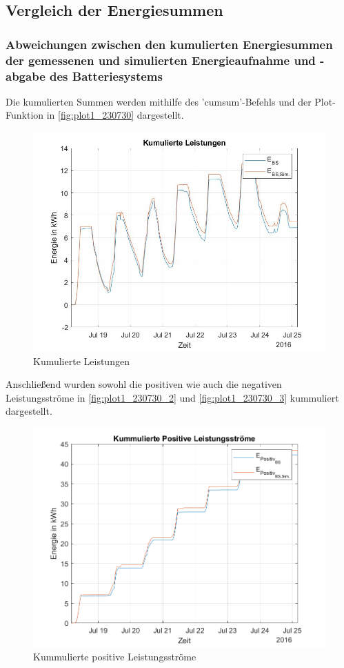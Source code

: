 \subsection{Vergleich der Energiesummen}
\subsubsection{Abweichungen zwischen den kumulierten Energiesummen der gemessenen und
simulierten Energieaufnahme und -abgabe des Batteriesystems}
Die kumulierten Summen werden mithilfe des 'cumsum'-Befehls und der Plot-Funktion in \autoref{fig:plot1_230730} dargestellt.

\begin{figure}[H]
    \centering
    \includegraphics[width=\textwidth]{Abbildungen/kummulierteleistungen.jpg}
    \caption{Kumulierte Leistungen}
    \label{fig:plot1_230730}
\end{figure}
Anschließend wurden sowohl die positiven wie auch die negativen Leistungsströme in \autoref{fig:plot1_230730_2} und \autoref{fig:plot1_230730_3} kummuliert dargestellt.
\begin{figure}[H]
    \centering
    \includegraphics[width=\textwidth]{Abbildungen/plot5.png}
    \caption{Kummulierte positive Leistungsströme}
    \label{fig:plot1_230730_2}
\end{figure}

